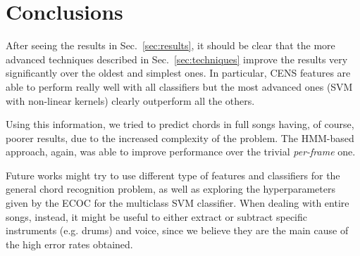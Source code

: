 \section{Conclusions}
\label{sec:conclusions}

After seeing the results in Sec.~\ref{sec:results}, it should be clear that the more advanced techniques described in Sec.~\ref{sec:techniques} improve the results very significantly over the oldest and simplest ones. In particular, CENS features are able to perform really well with all classifiers but the most advanced ones (SVM with non-linear kernels) clearly outperform all the others.

Using this information, we tried to predict chords in full songs having, of course, poorer results, due to the increased complexity of the problem. The HMM-based approach, again, was able to improve performance over the trivial \textit{per-frame} one. 

Future works might try to use different type of features and classifiers for the general chord recognition problem, as well as exploring the hyperparameters given by the ECOC for the multiclass SVM classifier. When dealing with entire songs, instead, it might be useful to either extract or subtract specific instruments (e.g. drums) and voice, since we believe they are the main cause of the high error rates obtained.
